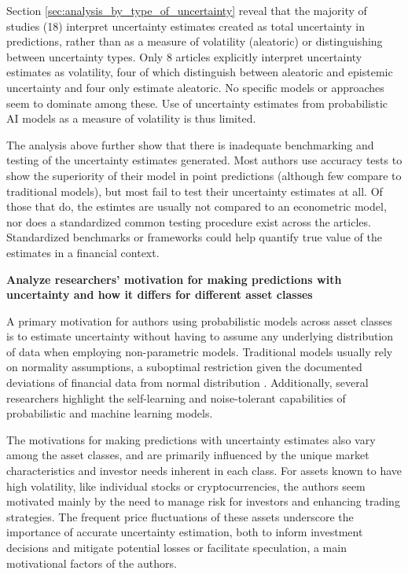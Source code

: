 Section \ref{sec:analysis_by_type_of_uncertainty} reveal that the majority of studies (18) interpret uncertainty estimates created as total uncertainty in predictions, rather than as a measure of volatility (aleatoric) or distinguishing between uncertainty types. Only 8 articles explicitly interpret uncertainty estimates as volatility, four of which distinguish between aleatoric and epistemic uncertainty and four only estimate aleatoric. No specific models or approaches seem to dominate among these. Use of uncertainty estimates from probabilistic AI models as a measure of volatility is thus limited. 

The analysis above further show that there is inadequate benchmarking and testing of the uncertainty estimates generated. Most authors use accuracy tests to show the superiority of their model in point predictions (although few compare to traditional models), but most fail to test their uncertainty estimates at all. Of those that do, the estimtes are usually not compared to an econometric model, nor does a standardized common testing procedure exist across the articles.  
Standardized benchmarks or frameworks could help quantify true value of the estimates in a financial context.

\textbf{Analyze researchers' motivation for making predictions with uncertainty and how it differs for different asset classes}\nopagebreak

A primary motivation for authors using probabilistic models across asset classes is to estimate uncertainty without having to assume any underlying distribution of data when employing non-parametric models. Traditional models usually rely on normality assumptions, a suboptimal restriction given the documented deviations of financial data from normal distribution \parencite{Peir1994TheDO}. Additionally, several researchers highlight the self-learning and noise-tolerant capabilities of probabilistic and machine learning models.

The motivations for making predictions with uncertainty estimates also vary among the asset classes, and are primarily influenced by the unique market characteristics and investor needs inherent in each class. For assets known to have high volatility, like individual stocks or cryptocurrencies, the authors seem motivated mainly by the need to manage risk for investors and enhancing trading strategies. The frequent price fluctuations of these assets underscore the importance of accurate uncertainty estimation, both to inform investment decisions and mitigate potential losses or facilitate speculation, a main motivational factors of the authors. 

